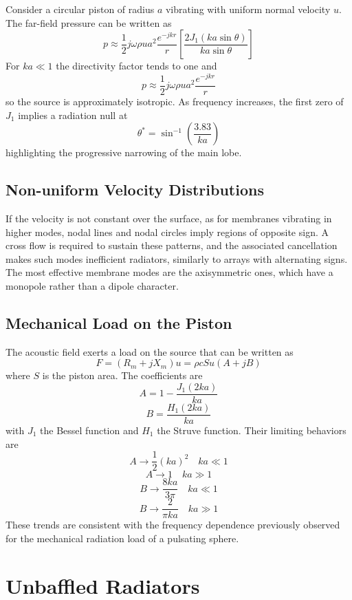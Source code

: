 Consider a circular piston of radius \( a \) vibrating with uniform normal velocity \( u \). The far-field pressure can be written as
\[
p \approx \frac{1}{2} j\omega\rho u a^{2} \frac{e^{-jkr}}{r}\left[\frac{2J_{1}(ka\sin\theta)}{ka\sin\theta}\right]
\]
For \( ka \ll 1 \) the directivity factor tends to one and
\[
p \approx \frac{1}{2} j\omega\rho u a^{2} \frac{e^{-jkr}}{r}
\]
so the source is approximately isotropic. As frequency increases, the first zero of \( J_{1} \) implies a radiation null at
\[
\theta^{\ast} = \sin^{-1}\left(\frac{3.83}{ka}\right)
\]
highlighting the progressive narrowing of the main lobe.

\subsection{Non-uniform Velocity Distributions} 

If the velocity is not constant over the surface, as for membranes vibrating in higher modes, nodal lines and nodal circles imply regions of opposite sign. A cross flow is required to sustain these patterns, and the associated cancellation makes such modes inefficient radiators, similarly to arrays with alternating signs. The most effective membrane modes are the axisymmetric ones, which have a monopole rather than a dipole character. 

\subsection{Mechanical Load on the Piston} 

The acoustic field exerts a load on the source that can be written as
\[
F = (R_{m} + jX_{m})u = \rho c S u (A + jB)
\]
where \( S \) is the piston area. The coefficients are
\[
A = 1 - \frac{J_{1}(2ka)}{ka}
\]
\[
B = \frac{H_{1}(2ka)}{ka}
\]
with \( J_{1} \) the Bessel function and \( H_{1} \) the Struve function. Their limiting behaviors are
\[
A \to \frac{1}{2}(ka)^{2} \quad ka \ll 1
\]
\[
A \to 1 \quad ka \gg 1
\]
\[
B \to \frac{8ka}{3\pi} \quad ka \ll 1
\]
\[
B \to \frac{2}{\pi ka} \quad ka \gg 1
\]
These trends are consistent with the frequency dependence previously observed for the mechanical radiation load of a pulsating sphere. 

\section{Unbaffled Radiators}

